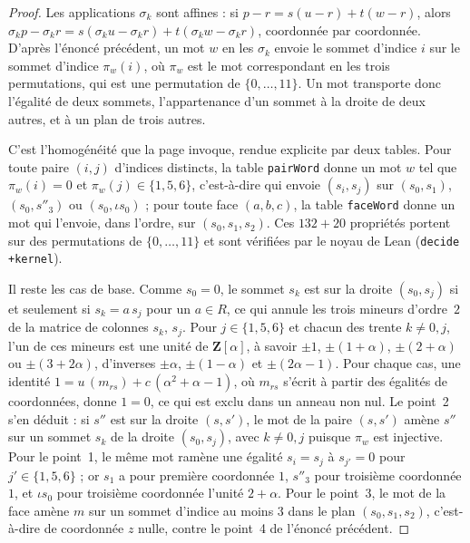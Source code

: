 \begin{proof}
Les applications $\sigma_k$ sont affines : si $p - r = s(u - r) + t(w - r)$, alors $\sigma_k p - \sigma_k r = s(\sigma_k u - \sigma_k r) + t(\sigma_k w - \sigma_k r)$, coordonnée par coordonnée. D'après l'énoncé précédent, un mot $w$ en les $\sigma_k$ envoie le sommet d'indice $i$ sur le sommet d'indice $\pi_w(i)$, où $\pi_w$ est le mot correspondant en les trois permutations, qui est une permutation de $\{0, \dots, 11\}$. Un mot transporte donc l'égalité de deux sommets, l'appartenance d'un sommet à la droite de deux autres, et à un plan de trois autres.

C'est l'homogénéité que la page invoque, rendue explicite par deux tables. Pour toute paire $(i, j)$ d'indices distincts, la table \texttt{pairWord} donne un mot $w$ tel que $\pi_w(i) = 0$ et $\pi_w(j) \in \{1, 5, 6\}$, c'est-à-dire qui envoie $(s_i, s_j)$ sur $(s_0, s_1)$, $(s_0, s''_3)$ ou $(s_0, \iota s_0)$ ; pour toute face $(a, b, c)$, la table \texttt{faceWord} donne un mot qui l'envoie, dans l'ordre, sur $(s_0, s_1, s_2)$. Ces $132 + 20$ propriétés portent sur des permutations de $\{0, \dots, 11\}$ et sont vérifiées par le noyau de Lean (\texttt{decide +kernel}).

Il reste les cas de base. Comme $s_0 = 0$, le sommet $s_k$ est sur la droite $(s_0, s_j)$ si et seulement si $s_k = a\,s_j$ pour un $a \in R$, ce qui annule les trois mineurs d'ordre~$2$ de la matrice de colonnes $s_k$, $s_j$. Pour $j \in \{1, 5, 6\}$ et chacun des trente $k \neq 0, j$, l'un de ces mineurs est une unité de $\mathbf Z[\alpha]$, à savoir $\pm 1$, $\pm(1 + \alpha)$, $\pm(2 + \alpha)$ ou $\pm(3 + 2\alpha)$, d'inverses $\pm\alpha$, $\pm(1 - \alpha)$ et $\pm(2\alpha - 1)$. Pour chaque cas, une identité $1 = u\,(m_{rs}) + c\,(\alpha^2 + \alpha - 1)$, où $m_{rs}$ s'écrit à partir des égalités de coordonnées, donne $1 = 0$, ce qui est exclu dans un anneau non nul. Le point~2 s'en déduit : si $s''$ est sur la droite $(s, s')$, le mot de la paire $(s, s')$ amène $s''$ sur un sommet $s_k$ de la droite $(s_0, s_j)$, avec $k \neq 0, j$ puisque $\pi_w$ est injective. Pour le point~1, le même mot ramène une égalité $s_i = s_j$ à $s_{j'} = 0$ pour $j' \in \{1, 5, 6\}$ ; or $s_1$ a pour première coordonnée $1$, $s''_3$ pour troisième coordonnée $1$, et $\iota s_0$ pour troisième coordonnée l'unité $2 + \alpha$. Pour le point~3, le mot de la face amène $m$ sur un sommet d'indice au moins $3$ dans le plan $(s_0, s_1, s_2)$, c'est-à-dire de coordonnée $z$ nulle, contre le point~4 de l'énoncé précédent.
\end{proof}

